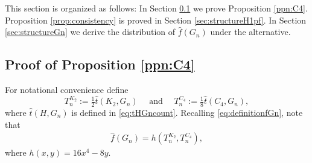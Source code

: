 \documentclass[11pt,reqno]{amsart}
\numberwithin{equation}{section}
\theoremstyle{definition}
\begin{document}
This section is organized as follows: In Section \ref{sec:structureH0pf}
we prove Proposition \ref{ppn:C4}. Proposition \ref{prop:consistency}  is proved in Section \ref{sec:structureH1pf}. In Section \ref{sec:structureGn} we derive the distribution of $\hat f(G_n)$ under the alternative. 
\subsection{Proof of Proposition \ref{ppn:C4}}
\label{sec:structureH0pf}

For notational convenience define $$T_{n}^{K_2} := \tfrac{1}{2} \hat{t}(K_{2}, G_n) \quad \text{ and } \quad T_{n}^{C_4} := \tfrac{1}{8} \hat{t}(C_{4}, G_n) , $$ 
where $\hat{t}(H, G_n)$ is defined in \eqref{eq:tHGncount}. Recalling \eqref{eq:definitionfGn}, note that 
\begin{align}
\label{eq:fGn}
\hat f(G_n) = h(T_{n}^{K_2}, T_{n}^{C_4}),
\end{align} where $h(x,y) = 16x^4 - 8y$. 
\end{document}
